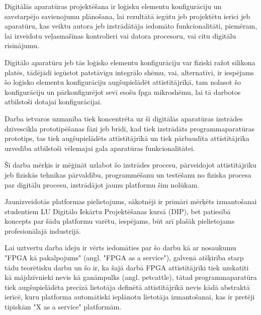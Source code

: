 Digitālās aparatūras projektēšana ir loģisku elementu konfigurāciju un
savstarpējo savienojumu plānošana, lai rezultātā iegūtu jeb projektētu ierīci
jeb aparatūru, kas veiktu autora jeb izstrādātāja iedomāto funkcionalitāti,
piemēram, lai izveidotu veļasmašīnas kontrolieri vai datora procesoru, vai citu
digitālu risinājumu.  
  
Digitālo aparatūru jeb tās loģisko elementu konfigurāciju var fiziski ražot
silikona platēs, tādējādi iegūstot patstāvīgu integrālo shēmu, vai, alternatīvi,
ir iespējams šo loģisko elementu konfigurāciju augšupielādēt attīstītājrīkā, tam
nolasot šo konfigurāciju un pārkonfigurējot sevī esošu \gls{fpga} mikroshēmu,
lai tā darbotos atbilstoši dotajai konfigurācijai.  

Darba ietvaros uzmanība tiek koncentrēta uz šī digitālās aparatūras izstrādes
dzīvescikla prototipēšanas fāzi jeb brīdi, kad tiek izstrādāts
programmaparatūras prototips, tas tiek augšupielādēts attīstītājrīkā un tiek
pārbaudīta attīstītājrīka uzvedība atbilstoši vēlemajai gala aparatūras
funkcionalitātei.

Šī darba mērķis ir mēģināt uzlabot šo izstrādes procesu, pārveidojot
attīstītājrīku jeb fiziskās tehnikas pārvaldību, programmēšanu un testēšanu no
fiziska procesa par digitālu procesu, izstrādājot jaunu platformu šim nolūkam.

Jaunizveidotās platformas pielietojums, sākotnēji ir primāri mērķēts
izmantošanai studentiem LU Digitālo Iekārtu Projektēšanas kursā (DIP), bet
patiesībā koncepts par šādu platformu varētu, iespējams, būt arī plašāk
pielietojams profesionālajā industrijā.

Lai uztvertu darba ideju ir vērts iedomāties par šo darbu kā ar nosaukumu "FPGA
kā pakalpojums" (angl. "FPGA as a service"), galvenā atšķirība starp tādu
teorētisku darbu un šo ir, ka šajā darbā FPGA attīstītājrīki tiek uzskatīti kā
mājdzīvnieki nevis kā ganāmpulks (angl. \gls{petcattle}), tātad
programmaparatūra tiek augšupielādēta precīzā lietotāja definētā attīstītājrīkā
nevis kādā abstraktā ierīcē, kuru platforma automātiski ieplānotu lietotāja
izmantošanai, kas ir pretēji tipiskām "X as a service" platformām.
  